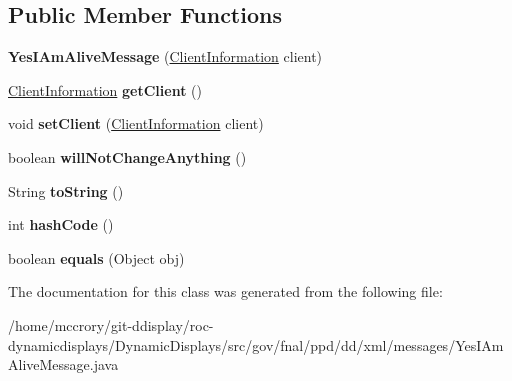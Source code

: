 \subsection*{Public Member Functions}
\begin{DoxyCompactItemize}
\item 
\hypertarget{classgov_1_1fnal_1_1ppd_1_1dd_1_1xml_1_1messages_1_1YesIAmAliveMessage_a4acc53e888b2811d12084c51be7f86cd}{{\bfseries Yes\-I\-Am\-Alive\-Message} (\hyperlink{classgov_1_1fnal_1_1ppd_1_1dd_1_1xml_1_1ClientInformation}{Client\-Information} client)}\label{classgov_1_1fnal_1_1ppd_1_1dd_1_1xml_1_1messages_1_1YesIAmAliveMessage_a4acc53e888b2811d12084c51be7f86cd}

\item 
\hypertarget{classgov_1_1fnal_1_1ppd_1_1dd_1_1xml_1_1messages_1_1YesIAmAliveMessage_aafc83ea0c391f9665d73ef6d1bcbea50}{\hyperlink{classgov_1_1fnal_1_1ppd_1_1dd_1_1xml_1_1ClientInformation}{Client\-Information} {\bfseries get\-Client} ()}\label{classgov_1_1fnal_1_1ppd_1_1dd_1_1xml_1_1messages_1_1YesIAmAliveMessage_aafc83ea0c391f9665d73ef6d1bcbea50}

\item 
\hypertarget{classgov_1_1fnal_1_1ppd_1_1dd_1_1xml_1_1messages_1_1YesIAmAliveMessage_ab51a53df10ec5d67e22438c24c7c0457}{void {\bfseries set\-Client} (\hyperlink{classgov_1_1fnal_1_1ppd_1_1dd_1_1xml_1_1ClientInformation}{Client\-Information} client)}\label{classgov_1_1fnal_1_1ppd_1_1dd_1_1xml_1_1messages_1_1YesIAmAliveMessage_ab51a53df10ec5d67e22438c24c7c0457}

\item 
\hypertarget{classgov_1_1fnal_1_1ppd_1_1dd_1_1xml_1_1messages_1_1YesIAmAliveMessage_a6996a1e0edef1c8aacd9188cae1ba883}{boolean {\bfseries will\-Not\-Change\-Anything} ()}\label{classgov_1_1fnal_1_1ppd_1_1dd_1_1xml_1_1messages_1_1YesIAmAliveMessage_a6996a1e0edef1c8aacd9188cae1ba883}

\item 
\hypertarget{classgov_1_1fnal_1_1ppd_1_1dd_1_1xml_1_1messages_1_1YesIAmAliveMessage_a5ac5cd0b0875b1d8f9cee5d5354c1aed}{String {\bfseries to\-String} ()}\label{classgov_1_1fnal_1_1ppd_1_1dd_1_1xml_1_1messages_1_1YesIAmAliveMessage_a5ac5cd0b0875b1d8f9cee5d5354c1aed}

\item 
\hypertarget{classgov_1_1fnal_1_1ppd_1_1dd_1_1xml_1_1messages_1_1YesIAmAliveMessage_abe4ba87f5b6d8a764179fafa09f8f39f}{int {\bfseries hash\-Code} ()}\label{classgov_1_1fnal_1_1ppd_1_1dd_1_1xml_1_1messages_1_1YesIAmAliveMessage_abe4ba87f5b6d8a764179fafa09f8f39f}

\item 
\hypertarget{classgov_1_1fnal_1_1ppd_1_1dd_1_1xml_1_1messages_1_1YesIAmAliveMessage_ab18642e1550a6044e5ba2d7b3f4cef7a}{boolean {\bfseries equals} (Object obj)}\label{classgov_1_1fnal_1_1ppd_1_1dd_1_1xml_1_1messages_1_1YesIAmAliveMessage_ab18642e1550a6044e5ba2d7b3f4cef7a}

\end{DoxyCompactItemize}


The documentation for this class was generated from the following file\-:\begin{DoxyCompactItemize}
\item 
/home/mccrory/git-\/ddisplay/roc-\/dynamicdisplays/\-Dynamic\-Displays/src/gov/fnal/ppd/dd/xml/messages/Yes\-I\-Am\-Alive\-Message.\-java\end{DoxyCompactItemize}
